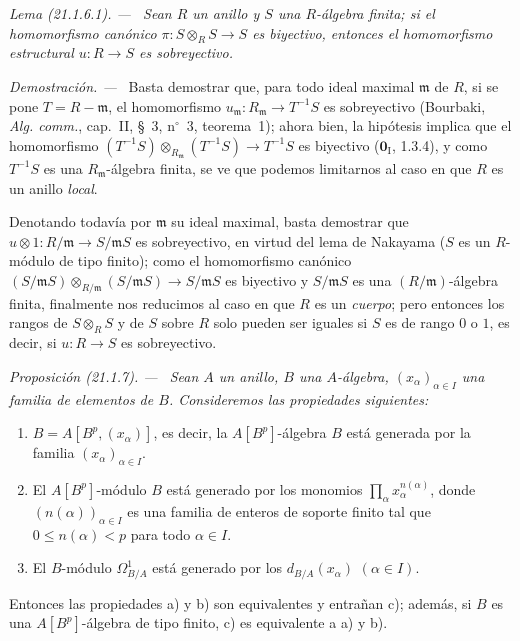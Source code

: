 \documentclass[10pt,oneside]{book}
\makeatletter
\newcommand{\setmanualcurrentlabel}[1]{\def\@currentlabel{#1}}
\newenvironment{proposition}[1][]{%
  \setmanualcurrentlabel{#1}\par\medskip\noindent\itshape Proposición (#1). ---\ }{\par}
\newenvironment{lemma}[1][]{%
  \setmanualcurrentlabel{#1}\par\medskip\noindent\itshape Lema (#1). ---\ }{\par}
\newenvironment{proof}{%
  \par\medskip\noindent\textit{Demostración. ---\ }}{\par}
\providecommand{\setmin}{-}%
\makeatother
\begin{document}
\begin{lemma}[21.1.6.1]
\label{0.21.1.6.1-es}
Sean $R$ un anillo y $S$ una $R$-álgebra finita; si el homomorfismo canónico
$\pi:S\otimes_R S\to S$ es biyectivo, entonces el homomorfismo estructural
$u:R\to S$ es sobreyectivo.
\end{lemma}

\begin{proof}
Basta demostrar que, para todo ideal maximal $\mathfrak m$ de $R$, si se
pone $T=R\setmin\mathfrak m$, el homomorfismo
$u_{\mathfrak m}:R_{\mathfrak m}\to T^{-1}S$ es sobreyectivo (Bourbaki,
\emph{Alg. comm.}, cap.~II, §~3, n$^\circ$~3, teorema~1); ahora bien, la
hipótesis implica que el homomorfismo
$(T^{-1}S)\otimes_{R_{\mathfrak m}}(T^{-1}S)\to T^{-1}S$
es biyectivo ($\mathbf 0_{\mathrm I}$, 1.3.4), y como $T^{-1}S$ es una
$R_{\mathfrak m}$-álgebra finita, se ve que podemos limitarnos al caso en
que $R$ es un anillo \emph{local}.

Denotando todavía por $\mathfrak m$ su ideal maximal, basta demostrar que
$u\otimes1:R/\mathfrak m\to S/\mathfrak mS$ es sobreyectivo, en virtud del
lema de Nakayama ($S$ es un $R$-módulo de tipo finito); como el homomorfismo
canónico
$(S/\mathfrak mS)\otimes_{R/\mathfrak m}(S/\mathfrak mS)\to S/\mathfrak mS$
es biyectivo y $S/\mathfrak mS$ es una $(R/\mathfrak m)$-álgebra finita,
finalmente nos reducimos al caso en que $R$ es un \emph{cuerpo}; pero entonces los
rangos de $S\otimes_R S$ y de $S$ sobre $R$ solo pueden ser iguales si $S$
es de rango $0$ o $1$, es decir, si $u:R\to S$ es sobreyectivo.
\end{proof}

\begin{proposition}[21.1.7]
\label{0.21.1.7-es}
Sean $A$ un anillo, $B$ una $A$-álgebra, $(x_\alpha)_{\alpha\in I}$ una
familia de elementos de $B$. Consideremos las propiedades siguientes:
\begin{enumerate}
  \item[\textup{a)}] $B=A[B^p,(x_\alpha)]$, es decir, la $A[B^p]$-álgebra $B$ está
  generada por la familia $(x_\alpha)_{\alpha\in I}$.
  \item[\textup{b)}] El $A[B^p]$-módulo $B$ está generado por los monomios
  $\prod_\alpha x_\alpha^{n(\alpha)}$, donde $(n(\alpha))_{\alpha\in I}$ es
  una familia de enteros de soporte finito tal que $0\leq n(\alpha)<p$ para
  todo $\alpha\in I$.
  \item[\textup{c)}] El $B$-módulo $\Omega^1_{B/A}$ está generado por los
  $d_{B/A}(x_\alpha)$ $(\alpha\in I)$.
\end{enumerate}
Entonces las propiedades \textup{a)} y \textup{b)} son equivalentes y entrañan \textup{c)}; además, si
$B$ es una $A[B^p]$-álgebra de tipo finito, \textup{c)} es equivalente a \textup{a)} y \textup{b)}.
\end{proposition}
\end{document}

